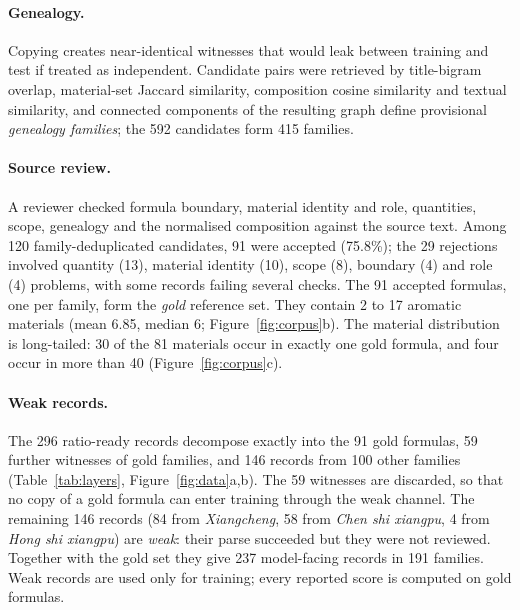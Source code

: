 \documentclass[10pt,a4paper]{article}
\begin{document}
\paragraph{Genealogy.} Copying creates near-identical witnesses that would leak between training and test if treated as independent. Candidate pairs were retrieved by title-bigram overlap, material-set Jaccard similarity, composition cosine similarity and textual similarity, and connected components of the resulting graph define provisional \emph{genealogy families}; the 592 candidates form 415 families.

\paragraph{Source review.} A reviewer checked formula boundary, material identity and role, quantities, scope, genealogy and the normalised composition against the source text. Among 120 family-deduplicated candidates, 91 were accepted (75.8\%); the 29 rejections involved quantity (13), material identity (10), scope (8), boundary (4) and role (4) problems, with some records failing several checks. The 91 accepted formulas, one per family, form the \emph{gold} reference set. They contain 2 to 17 aromatic materials (mean 6.85, median 6; Figure~\ref{fig:corpus}b). The material distribution is long-tailed: 30 of the 81 materials occur in exactly one gold formula, and four occur in more than 40 (Figure~\ref{fig:corpus}c).

\paragraph{Weak records.} The 296 ratio-ready records decompose exactly into the 91 gold formulas, 59 further witnesses of gold families, and 146 records from 100 other families (Table~\ref{tab:layers}, Figure~\ref{fig:data}a,b). The 59 witnesses are discarded, so that no copy of a gold formula can enter training through the weak channel. The remaining 146 records (84 from \emph{Xiangcheng}, 58 from \emph{Chen shi xiangpu}, 4 from \emph{Hong shi xiangpu}) are \emph{weak}: their parse succeeded but they were not reviewed. Together with the gold set they give 237 model-facing records in 191 families. Weak records are used only for training; every reported score is computed on gold formulas.
\end{document}

